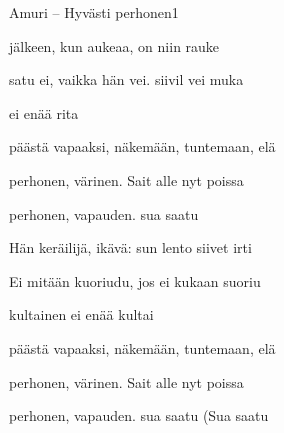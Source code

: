 \documentclass[11pt,a4paper]{article}
\begin{document}
\thispagestyle{empty}
\begin{mysong}{Amuri – Hyvästi perhonen}{1}

\begin{SBVerse}
   jälkeen, kun  aukeaa, on  niin
   rauke

   satu ei, vaikka  hän vei. 
  siivil vei muka

    ei  enää
   rita

   päästä vapaaksi,  näkemään, 
  tuntemaan,  elä
\end{SBVerse}

\begin{SBChorus}
   perhonen,  värinen. Sait  alle
   nyt poissa 

   perhonen,  vapauden.
   sua saatu 
\end{SBChorus}


\begin{SBVerse}
  Hän  keräilijä,  ikävä:  sun lento
   siivet irti 

  Ei  mitään  kuoriudu, jos ei 
  kukaan  suoriu

    kultainen ei  enää
   kultai

   päästä vapaaksi,  näkemään, 
  tuntemaan,  elä
\end{SBVerse}

\begin{SBChorus}
   perhonen,  värinen. Sait  alle
   nyt poissa 

   perhonen,  vapauden.
   sua saatu  (Sua saatu
\end{SBChorus}


\end{mysong}
\end{document}
